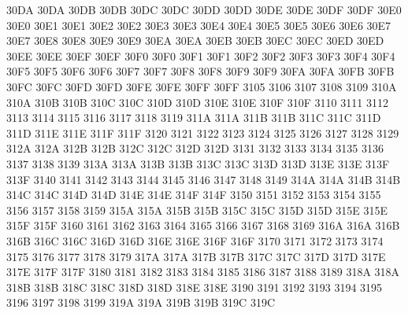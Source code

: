\ID 30DA 30DA
\ID 30DB 30DB
\ID 30DC 30DC
\ID 30DD 30DD
\ID 30DE 30DE
\ID 30DF 30DF
\ID 30E0 30E0
\ID 30E1 30E1
\ID 30E2 30E2
\NS 30E3 30E3
\ID 30E4 30E4
\NS 30E5 30E5
\ID 30E6 30E6
\NS 30E7 30E7
\ID 30E8 30E8
\ID 30E9 30E9
\ID 30EA 30EA
\ID 30EB 30EB
\ID 30EC 30EC
\ID 30ED 30ED
\NS 30EE 30EE
\ID 30EF 30EF
\ID 30F0 30F0
\ID 30F1 30F1
\ID 30F2 30F2
\ID 30F3 30F3
\ID 30F4 30F4
\NS 30F5 30F5
\NS 30F6 30F6
\ID 30F7 30F7
\ID 30F8 30F8
\ID 30F9 30F9
\ID 30FA 30FA
\NS 30FB 30FB
\NS 30FC 30FC
\NS 30FD 30FD
\NS 30FE 30FE
\ID 30FF 30FF
 3105
 3106
 3107
 3108
 3109
\ID 310A 310A
\ID 310B 310B
\ID 310C 310C
\ID 310D 310D
\ID 310E 310E
\ID 310F 310F
 3110
 3111
 3112
 3113
 3114
 3115
 3116
 3117
 3118
 3119
\ID 311A 311A
\ID 311B 311B
\ID 311C 311C
\ID 311D 311D
\ID 311E 311E
\ID 311F 311F
 3120
 3121
 3122
 3123
 3124
 3125
 3126
 3127
 3128
 3129
\ID 312A 312A
\ID 312B 312B
\ID 312C 312C
\ID 312D 312D
 3131
 3132
 3133
 3134
 3135
 3136
 3137
 3138
 3139
\ID 313A 313A
\ID 313B 313B
\ID 313C 313C
\ID 313D 313D
\ID 313E 313E
\ID 313F 313F
 3140
 3141
 3142
 3143
 3144
 3145
 3146
 3147
 3148
 3149
\ID 314A 314A
\ID 314B 314B
\ID 314C 314C
\ID 314D 314D
\ID 314E 314E
\ID 314F 314F
 3150
 3151
 3152
 3153
 3154
 3155
 3156
 3157
 3158
 3159
\ID 315A 315A
\ID 315B 315B
\ID 315C 315C
\ID 315D 315D
\ID 315E 315E
\ID 315F 315F
 3160
 3161
 3162
 3163
 3164
 3165
 3166
 3167
 3168
 3169
\ID 316A 316A
\ID 316B 316B
\ID 316C 316C
\ID 316D 316D
\ID 316E 316E
\ID 316F 316F
 3170
 3171
 3172
 3173
 3174
 3175
 3176
 3177
 3178
 3179
\ID 317A 317A
\ID 317B 317B
\ID 317C 317C
\ID 317D 317D
\ID 317E 317E
\ID 317F 317F
 3180
 3181
 3182
 3183
 3184
 3185
 3186
 3187
 3188
 3189
\ID 318A 318A
\ID 318B 318B
\ID 318C 318C
\ID 318D 318D
\ID 318E 318E
 3190
 3191
 3192
 3193
 3194
 3195
 3196
 3197
 3198
 3199
\ID 319A 319A
\ID 319B 319B
\ID 319C 319C
